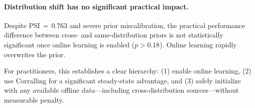 \paragraph{Distribution shift has no significant practical impact.}
Despite PSI$\,{=}\,0.763$ and severe prior miscalibration, the practical performance difference between cross- and same-distribution priors is not statistically significant once online learning is enabled ($p > 0.18$). Online learning rapidly overwrites the prior.

For practitioners, this establishes a clear hierarchy: (1) enable online learning, (2) use Corralling for a significant steady-state advantage, and (3) safely initialize with any available offline data---including cross-distribution sources---without measurable penalty.
